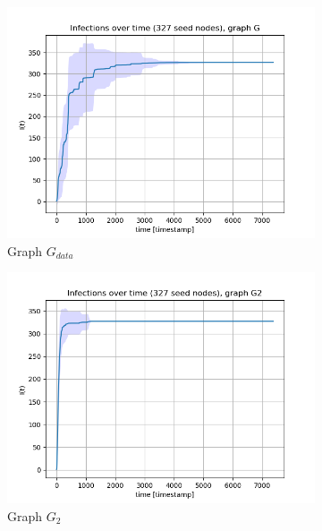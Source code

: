 \documentclass[letterpaper]{article}
\begin{document}
\begin{figure}
    \centering
    \begin{subfigure}[b]{0.32\textwidth}
        \includegraphics[width=\textwidth]{img/infections_G.png}
        \caption{Graph \(G_{data}\)}
	    \label{fig:infections_over_time_G}
    \end{subfigure}
    \begin{subfigure}[b]{0.32\textwidth}
        \includegraphics[width=\textwidth]{img/infections_G2.png}
        \caption{Graph \(G_2\)}
	    \label{fig:infections_over_time_G2}
    \end{subfigure}
    \begin{subfigure}[b]{0.32\textwidth}

\end{subfigure}
\end{figure}
\end{document}

